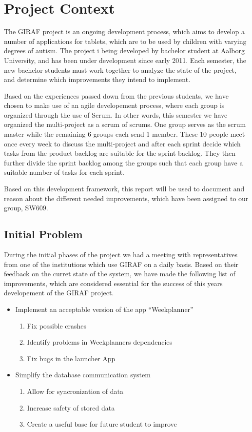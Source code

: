 \chapter{Project Context}
The GIRAF project is an ongoing development process, which aims to develop a
number of applications for tablets, which are to be used by children with
varying degrees of autism. The project i being developed by bachelor student at
Aalborg University, and has been under development since early 2011. Each
semester, the new bachelor students must work together to analyze the state of
the project, and determine which improvements they intend to implement.\nl

Based on the experiences passed down from the previous students, we have chosen
to make use of an agile developement process, where each group is organized
through the use of Scrum. In other words, this semester we have organized the
multi-project as a scrum of scrums. One group serves as the scrum master while
the remaining 6 groups each send 1 member. These 10 people meet once every week
to discuss the multi-project and after each sprint decide which tasks from the
product backlog are suitable for the sprint backlog. They then further divide
the sprint backlog among the groups such that each group have a suitable number
of tasks for each sprint.\nl

Based on this development framework, this report will be used to document and
reason about the different needed improvements, which have been assigned to our
group, SW609.

\section{Initial Problem}
During the initial phases of the project we had a meeting with representatives
from one of the institutions which use GIRAF on a daily basis. Based on their
feedback on the curret state of the system, we have made the following list of
improvements, which are considered essential for the success of this years
developement of the GIRAF project.

\begin{itemize}
  \item Implement an acceptable version of the app ``Weekplanner''
  	\begin{enumerate}
  		\item Fix possible crashes
  		\item Identify problems in Weekplanners dependencies
  		\item Fix bugs in the launcher App
	\end{enumerate}
  \item Simplify the database communication system
   	\begin{enumerate}
  		\item Allow for syncronization of data
  		\item Increase safety of stored data
  		\item Create a useful base for future student to improve
	\end{enumerate}
\end{itemize}



